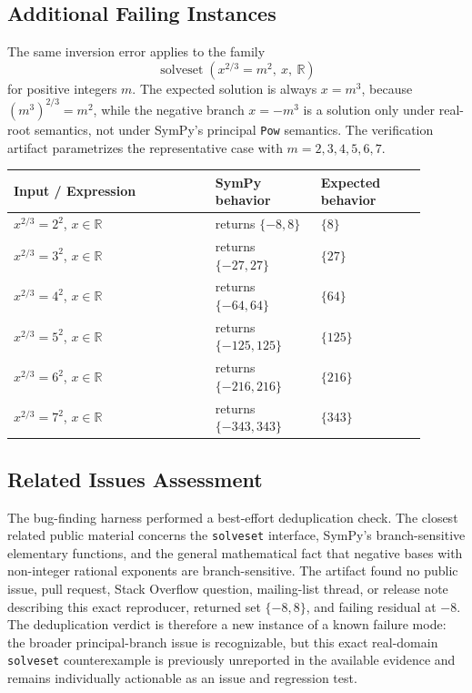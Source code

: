 \documentclass[11pt]{article}
\begin{document}
\subsection{Additional Failing Instances}

The same inversion error applies to the family
\[
    \operatorname{solveset}(x^{2/3}=m^2,\ x,\ \mathbb{R})
\]
for positive integers \(m\). The expected solution is always \(x=m^3\), because \((m^3)^{2/3}=m^2\), while the negative branch \(x=-m^3\) is a solution only under real-root semantics, not under SymPy's principal \texttt{Pow} semantics. The verification artifact parametrizes the representative case with \(m=2,3,4,5,6,7\).

\begin{center}
\small
\renewcommand{\arraystretch}{1.3}
\begin{tabular}{@{}>{\raggedright\arraybackslash}p{0.44\linewidth}>{\raggedright\arraybackslash}p{0.23\linewidth}>{\raggedright\arraybackslash}p{0.23\linewidth}@{}}
\toprule
\textbf{Input / Expression} & \textbf{SymPy behavior} & \textbf{Expected behavior} \\
\midrule
\(x^{2/3}=2^2\), \(x\in\mathbb{R}\) & returns \(\{-8, 8\}\) & \(\{8\}\) \\
\(x^{2/3}=3^2\), \(x\in\mathbb{R}\) & returns \(\{-27, 27\}\) & \(\{27\}\) \\
\(x^{2/3}=4^2\), \(x\in\mathbb{R}\) & returns \(\{-64, 64\}\) & \(\{64\}\) \\
\(x^{2/3}=5^2\), \(x\in\mathbb{R}\) & returns \(\{-125, 125\}\) & \(\{125\}\) \\
\(x^{2/3}=6^2\), \(x\in\mathbb{R}\) & returns \(\{-216, 216\}\) & \(\{216\}\) \\
\(x^{2/3}=7^2\), \(x\in\mathbb{R}\) & returns \(\{-343, 343\}\) & \(\{343\}\) \\
\bottomrule
\end{tabular}
\end{center}

\subsection{Related Issues Assessment}

The bug-finding harness performed a best-effort deduplication check. The closest related public material concerns the \texttt{solveset} interface, SymPy's branch-sensitive elementary functions, and the general mathematical fact that negative bases with non-integer rational exponents are branch-sensitive. The artifact found no public issue, pull request, Stack Overflow question, mailing-list thread, or release note describing this exact reproducer, returned set \(\{-8,8\}\), and failing residual at \(-8\). The deduplication verdict is therefore a new instance of a known failure mode: the broader principal-branch issue is recognizable, but this exact real-domain \texttt{solveset} counterexample is previously unreported in the available evidence and remains individually actionable as an issue and regression test.
\end{document}
